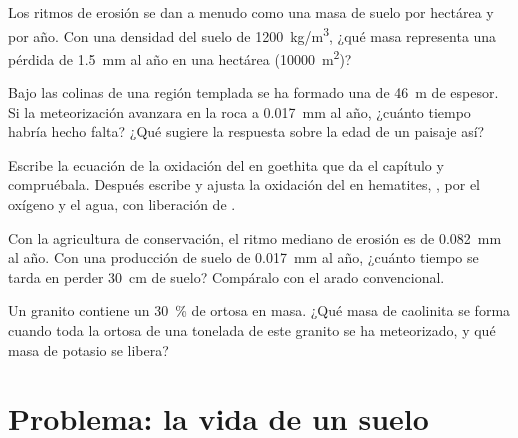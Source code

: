 \begin{exercise}[$\star\star$]\label{exo:g10:soil-formation:11}
Los ritmos de erosión se dan a menudo como una masa de suelo por hectárea y
por año. Con una densidad del suelo de \qty{1200}{kg/m^3}, ¿qué masa
representa una pérdida de \qty{1.5}{mm} al año en una hectárea
(\qty{10000}{m^2})?
\end{exercise}

\begin{exercise}[$\star\star\star$]\label{exo:g10:soil-formation:12}
Bajo las colinas de una región templada se ha formado una  de
\qty{46}{m} de espesor. Si la meteorización avanzara en la roca a
\qty{0.017}{mm} al año, ¿cuánto tiempo habría hecho falta? ¿Qué sugiere la
respuesta sobre la edad de un paisaje así?
\end{exercise}

\begin{exercise}[$\star\star\star$]\label{exo:g10:soil-formation:13}
Escribe la ecuación de la oxidación del  en goethita que da el
capítulo y compruébala. Después escribe y ajusta la oxidación del 
en hematites, , por el oxígeno y el agua, con liberación de .
\end{exercise}

\begin{exercise}[$\star\star\star$]\label{exo:g10:soil-formation:14}
Con la agricultura de conservación, el ritmo mediano de erosión es de
\qty{0.082}{mm} al año. Con una producción de suelo de \qty{0.017}{mm} al
año, ¿cuánto tiempo se tarda en perder \qty{30}{cm} de suelo? Compáralo con
el arado convencional.
\end{exercise}

\begin{exercise}[$\star\star\star$]\label{exo:g10:soil-formation:15}
Un granito contiene un \qty{30}{\percent} de ortosa en masa. ¿Qué masa de
caolinita se forma cuando toda la ortosa de una tonelada de este granito se
ha meteorizado, y qué masa de potasio se libera?
\end{exercise}

\section{Problema: la vida de un suelo}

